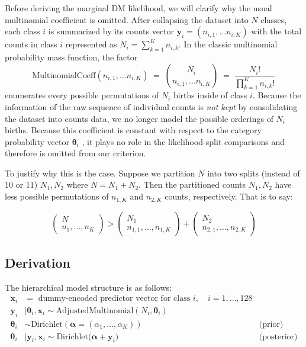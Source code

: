 Before deriving the marginal DM likelihood, we will clarify why the usual multinomial coefficient is omitted. After collapsing the dataset into \(N\)  classes, each class \(i\) is summarized by its counts vector \(\mathbf{y}_i = (n_{i,1}, \dots n_{i,K})\) with the total counts in class \(i\) represented as \(N_i = \sum_{k=1}^K n_{i,k}\). In the classic multinomial probability mass function, the factor 
\begin{equation*}
    \label{eq:multinomial-coef}
    \mathrm{MultinomialCoeff}(n_{i,1}, \dots n_{i,K})
  \;=\;
        \binom{N_i}{n_{i,1}, \dots n_{i,K}}
 \;=\; 
        \frac{N_i!}{\prod_{k=1}^K n_{i,k}!}
\end{equation*} 
enumerates every possible permutations of \(N_i\) births inside of class \(i\). Because the information of the raw sequence of individual counts is \emph{not kept} by consolidating the dataset into counts data, we no longer model the possible orderings of \(N_i\) births. Because this coefficient is constant with respect to the category probability vector \(\boldsymbol{\theta}_i\) \parencite{wiki:dirichlet-multinomial}, it plays no role in the likelihood-split comparisons and therefore is omitted from our criterion.

To justify why this is the case. Suppose we partition \(N\) into two splits (instead of 10 or 11) \(N_1, N_2\) where \(N = N_1 + N_2\). Then the partitioned counts \(N_1,N_2\) have less possible permutations of \(n_{1,K}\) and \(n_{2,K}\) counts, respectively. That is to say: 


\[
     \begin{pmatrix}
         N \\ n_1, \dots, n_K
     \end{pmatrix}
     >
     \begin{pmatrix}
         N_1 \\ n_{1,1}, \dots, n_{1,K}
     \end{pmatrix}
     +
     \begin{pmatrix}
         N_2 \\ n_{2,1}, \dots, n_{2,K}
     \end{pmatrix}
\]


\subsection{Derivation}
\label{sec:ch2-likelihood-derivation}

The hierarchical model structure is as follows: 
\begin{align*}
    \mathbf{x}_i &=\text{ dummy-encoded predictor vector for class } i, \quad i = 1,\dots,128 \\
    \mathbf{y}_i &\mid \boldsymbol{\theta}_i, \mathbf{x}_i \sim \mathrm{AdjustedMultinomial}\left(N_i, \boldsymbol{\theta}_i\right)\\
    \boldsymbol{\theta}_i  &\sim \mathrm{Dirichlet}\left(\boldsymbol{\alpha}= (\alpha_1, \dots, \alpha_K)\right) \quad  & \text{(prior)}\\
    \boldsymbol{\theta}_i &\mid \mathbf{y}_i, \mathbf{x}_i \sim \mathrm{Dirichlet}\bigl(\boldsymbol{\alpha} + \mathbf{y}_i \bigr) \quad & \text{(posterior)}
\end{align*}

